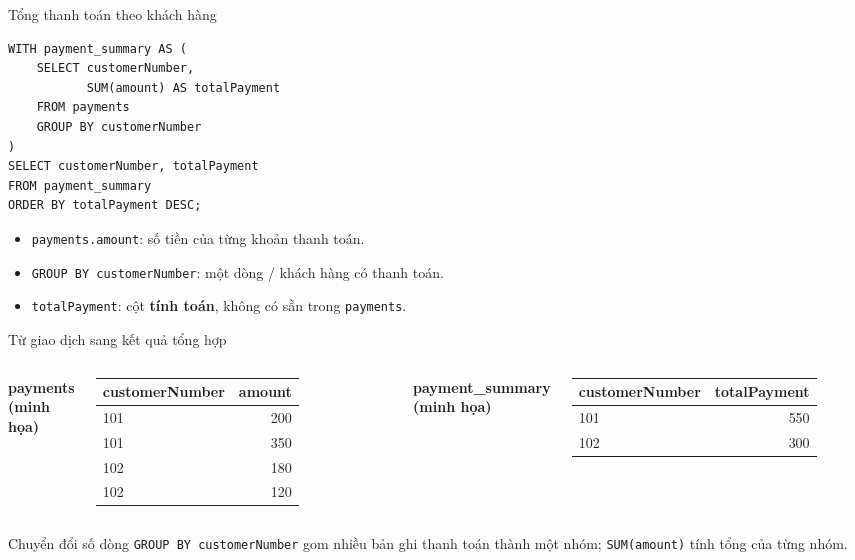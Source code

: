 \documentclass[aspectratio=169,10pt]{beamer}
\newcommand{\code}[1]{\texttt{#1}}
\begin{document}
\begin{frame}[fragile]{Tổng thanh toán theo khách hàng}
\small
\begin{lstlisting}[basicstyle=\ttfamily\scriptsize]
WITH payment_summary AS (
    SELECT customerNumber,
           SUM(amount) AS totalPayment
    FROM payments
    GROUP BY customerNumber
)
SELECT customerNumber, totalPayment
FROM payment_summary
ORDER BY totalPayment DESC;
\end{lstlisting}
\vspace{.1em}
\begin{itemize}
\item \code{payments.amount}: số tiền của từng khoản thanh toán.
\item \code{GROUP BY customerNumber}: một dòng / khách hàng có thanh toán.
\item \code{totalPayment}: cột \textbf{tính toán}, không có sẵn trong \code{payments}.
\end{itemize}
\end{frame}

\begin{frame}[fragile]{Từ giao dịch sang kết quả tổng hợp}

\small
\begin{columns}[T,onlytextwidth]
\textbf{payments (minh họa)}
\begin{tabular}{l r}
\toprule
customerNumber & amount\\\midrule
101 & 200\\
101 & 350\\
102 & 180\\
102 & 120\\
\bottomrule
\end{tabular}
\textbf{payment\_summary (minh họa)}
\begin{tabular}{l r}
\toprule
customerNumber & totalPayment\\\midrule
101 & 550\\
102 & 300\\
\bottomrule
\end{tabular}
\end{columns}
\vspace{.35cm}
\begin{block}{Chuyển đổi số dòng}
\texttt{GROUP BY customerNumber} gom nhiều bản ghi thanh toán thành một nhóm; \texttt{SUM(amount)} tính tổng của từng nhóm.
\end{block}
\end{frame}
\end{document}
